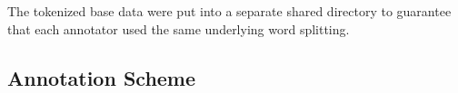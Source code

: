 The tokenized base data were put into a separate shared directory to
guarantee that each annotator used the same underlying word splitting.

\subsection{Annotation Scheme}\label{subsec:snt:ascheme}


